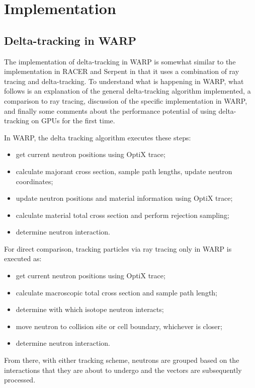 \chapter{Implementation}

\section{Delta-tracking in WARP}

The implementation of delta-tracking in WARP is somewhat similar to the implementation in RACER and 
Serpent in that it uses a combination of ray tracing and delta-tracking. 
To understand what is happening in WARP, what follows is an explanation of the general delta-tracking 
algorithm implemented, a comparison to ray tracing, discussion of the specific implementation in WARP, and
finally some comments about the performance potential of using delta-tracking on GPUs for the first time.

In WARP, the delta tracking algorithm executes these steps:

\begin{itemize}
	\item{get current neutron positions using OptiX trace;}
	\item{calculate majorant cross section, sample path lengths, update neutron coordinates;}
	\item{update neutron positions and material information using OptiX trace;}
	\item{calculate material total cross section and perform rejection sampling;}
	\item{determine neutron interaction.}
\end{itemize}

\noindent For direct comparison, tracking particles via ray tracing only in WARP is executed as:

\begin{itemize}
	\item{get current neutron positions using OptiX trace;}
	\item{calculate macroscopic total cross section and sample path length;}
	\item{determine with which isotope neutron interacts;}
	\item{move neutron to collision site or cell boundary, whichever is closer;}
	\item{determine neutron interaction.}
\end{itemize}

\noindent From there, with either tracking scheme, neutrons are grouped based on the interactions that 
they are about to undergo and the vectors are subsequently processed.


